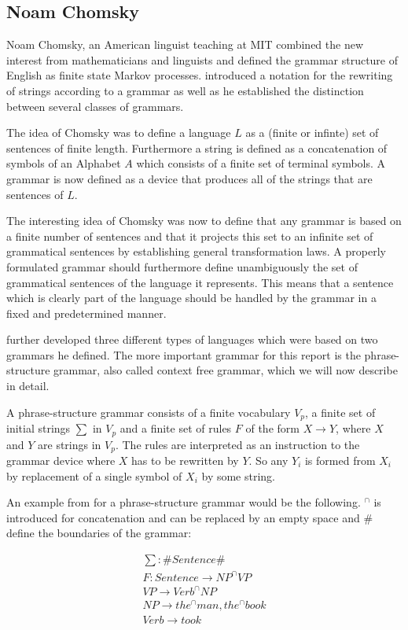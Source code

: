 \documentclass{article}
\begin{document}
\subsection{Noam Chomsky}
Noam Chomsky, an American linguist teaching at MIT combined the new interest from mathematicians and linguists and defined the grammar structure of English as finite state Markov processes. \cite{1056813} introduced a notation for the rewriting of strings according to a grammar as well as he established the distinction between several classes of grammars. 

The idea of Chomsky was to define a language $L$ as a (finite or infinte) set of sentences of finite length. Furthermore a string is defined as a concatenation of symbols of an Alphabet $A$ which consists of a finite set of terminal symbols. A grammar is now defined as a device that produces all of the strings that are sentences of $L$. 

The interesting idea of Chomsky was now to define that any grammar is based on a finite number of sentences and that it projects this set to an infinite set of grammatical sentences by establishing general transformation laws. A properly formulated grammar should furthermore define unambiguously the set of grammatical sentences of the language it represents. This means that a sentence which is clearly part of the language should be handled by the grammar in a fixed and predetermined manner. 

\cite{1056813} further developed three different types of languages which were based on two grammars he defined. The more important grammar for this report is the phrase-structure grammar, also called context free grammar, which we will now describe in detail.

A phrase-structure grammar consists of a finite vocabulary $V_p$, a finite set of initial strings $\sum$ in $V_p$ and a finite set of rules $F$ of the form $X \to Y$, where $X$ and $Y$ are strings in $V_p$. The rules are interpreted as an instruction to the grammar device where $X$ has to be rewritten by $Y$. So any $Y_i$ is formed from $X_i$ by replacement of a single symbol of $X_i$ by some string. 

An example from \cite{1056813} for a phrase-structure grammar would be the following. $^{\cap}$ is introduced for concatenation and can be replaced by an empty space and \# define the boundaries of the grammar:

\begin{align*}
	\sum : \# Sentence \# \\
	F: Sentence \to NP^{\cap}VP \\
	VP \to Verb^{\cap}NP \\
	NP \to the^{\cap}man, the^{\cap}book \\
	Verb \to took
\end{align*}
\end{document}
